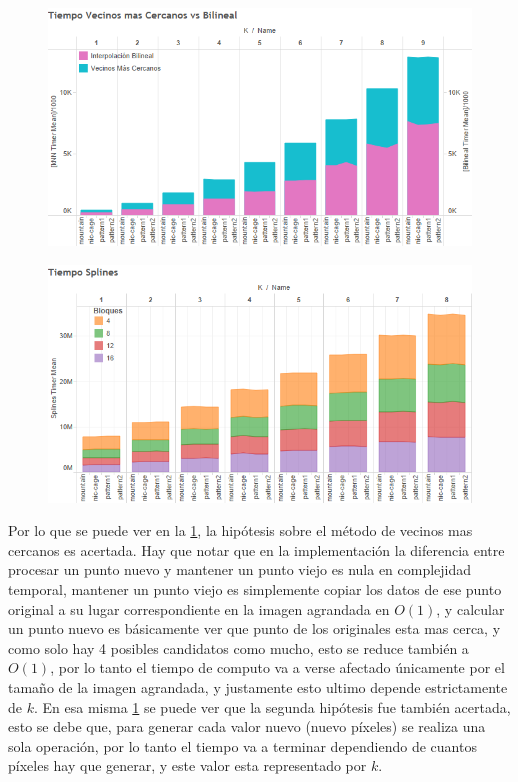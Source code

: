 \documentclass{article}
\begin{document}
\begin{figure}[H]
\centering
\includegraphics[scale=0.8]{BI-Time-knn_vs_bilineal.png}
\caption{}
\label{fig:BI-time-knn_vs_bilineal}
\end{figure}
\begin{figure}[H]
\centering
\includegraphics[scale=0.8]{BI-Time-Splines.png}
\caption{}
\label{fig:BI-time-Splines}
\end{figure}
Por lo que se puede ver en la \ref{fig:BI-time-knn_vs_bilineal}, la hipótesis sobre el método de vecinos mas cercanos es acertada. Hay que notar que en la implementación la diferencia entre procesar un punto nuevo y mantener un punto viejo es nula en complejidad temporal, mantener un punto viejo es simplemente copiar los datos de ese punto original a su lugar correspondiente en la imagen agrandada en $O(1)$, y calcular un punto nuevo es básicamente ver que punto de los originales esta mas cerca, y como solo hay 4 posibles candidatos como mucho, esto se reduce también a $O(1)$, por lo tanto el tiempo de computo va a verse afectado únicamente por el tamaño de la imagen agrandada, y justamente esto ultimo depende estrictamente de $k$.
En esa misma \ref{fig:BI-time-knn_vs_bilineal} se puede ver que la segunda hipótesis fue también acertada, esto se debe que, para generar cada valor nuevo (nuevo píxeles) se realiza una sola operación, por lo tanto el tiempo va a terminar dependiendo de cuantos píxeles hay que generar, y este valor esta representado por $k$.
\end{document}
